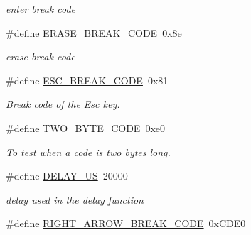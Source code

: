 \begin{DoxyCompactItemize}
\begin{DoxyCompactList}\small\item\em enter break code \end{DoxyCompactList}\item 
\mbox{\label{group__keyboard__macros_ga71a8fdf08c766bfa05e6524f64d16ed0}} 
\#define \hyperlink{group__keyboard__macros_ga71a8fdf08c766bfa05e6524f64d16ed0}{E\+R\+A\+S\+E\+\_\+\+B\+R\+E\+A\+K\+\_\+\+C\+O\+DE}~0x8e
\begin{DoxyCompactList}\small\item\em erase break code \end{DoxyCompactList}\item 
\mbox{\label{group__keyboard__macros_ga592dfdf397b21913348b4dd6b7759b2d}} 
\#define \hyperlink{group__keyboard__macros_ga592dfdf397b21913348b4dd6b7759b2d}{E\+S\+C\+\_\+\+B\+R\+E\+A\+K\+\_\+\+C\+O\+DE}~0x81
\begin{DoxyCompactList}\small\item\em Break code of the Esc key. \end{DoxyCompactList}\item 
\mbox{\label{group__keyboard__macros_ga2877405e9b042d1e29cc09bcc8daccfa}} 
\#define \hyperlink{group__keyboard__macros_ga2877405e9b042d1e29cc09bcc8daccfa}{T\+W\+O\+\_\+\+B\+Y\+T\+E\+\_\+\+C\+O\+DE}~0xe0
\begin{DoxyCompactList}\small\item\em To test when a code is two bytes long. \end{DoxyCompactList}\item 
\mbox{\label{group__keyboard__macros_ga1a522aa19bcb695a9df30032a893bee3}} 
\#define \hyperlink{group__keyboard__macros_ga1a522aa19bcb695a9df30032a893bee3}{D\+E\+L\+A\+Y\+\_\+\+US}~20000
\begin{DoxyCompactList}\small\item\em delay used in the delay function \end{DoxyCompactList}\item 
\mbox{\label{group__keyboard__macros_ga9b5c2e5a8f5495e736c3ff9cf6945ce6}} 
\#define \hyperlink{group__keyboard__macros_ga9b5c2e5a8f5495e736c3ff9cf6945ce6}{R\+I\+G\+H\+T\+\_\+\+A\+R\+R\+O\+W\+\_\+\+B\+R\+E\+A\+K\+\_\+\+C\+O\+DE}~0x\+C\+D\+E0

\end{DoxyCompactItemize}
